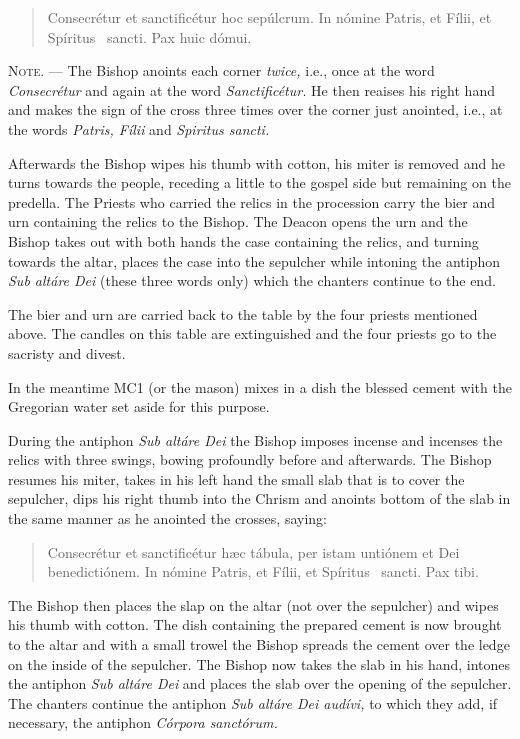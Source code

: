 \documentclass[letterpaper]{report}
\begin{document}
{    \begin{quote}
        Conse\cross crétur et sancti\cross ficétur hoc sepúlcrum. In nómine
        Pa\cross tris, et Fí\cross lii, et Spíritus \cross\ sancti. Pax huic
        dómui.
    \end{quote}

    \textsc{Note. ---} The Bishop anoints each corner \textit{twice,} i.e.,
    once at the word \textit{Consecr\'etur} and again at the word
    \textit{Sanctific\'etur.} He then reaises his right hand and makes the sign
    of the cross three times over the corner just anointed, i.e., at the words
    \textit{Patris, F\'ilii} and \textit{Spiritus sancti.}

    \rubric Afterwards the Bishop wipes his thumb with cotton, his miter is
    removed and he turns towards the people, receding a little to the gospel
    side but remaining on the predella. The Priests who carried the relics in
    the procession carry the bier and urn containing the relics to the Bishop.
    The Deacon opens the urn and the Bishop takes out with both hands the case
    containing the relics, and turning towards the altar, places the case into
    the sepulcher while intoning the antiphon \textit{Sub alt\'are Dei} (these
    three words only) which the chanters continue to the end.

    The bier and urn are carried back to the table by the four priests mentioned
    above. The candles on this table are extinguished and the four priests go to
    the sacristy and divest.

    In the meantime MC1 (or the mason) mixes in a dish the blessed cement with
    the Gregorian water set aside for this purpose.

    \rubric During the antiphon \textit{Sub alt\'are Dei} the Bishop imposes
    incense and incenses the relics with three swings, bowing profoundly before
    and afterwards. The Bishop resumes his miter, takes in his left hand the
    small slab that is to cover the sepulcher, dips his right thumb into the
    Chrism and anoints bottom of the slab in the same manner as he anointed the
    crosses, saying:

    \begin{quote}
        Conse\cross crétur et sancti\cross ficétur h\ae c tábula, per istam
        untiónem et Dei benedictiónem. In nómine Pa\cross tris, et Fí\cross lii, et
        Spíritus \cross\ sancti. Pax tibi.
    \end{quote}

    \rubric The Bishop then places the slap on the altar (not over the
    sepulcher) and wipes his thumb with cotton. The dish containing the
    prepared cement is now brought to the altar and with a small trowel the
    Bishop spreads the cement over the ledge on the inside of the sepulcher.
    The Bishop now takes the slab in his hand, intones the antiphon \textit{Sub
    alt\'are Dei} and places the slab over the opening of the sepulcher. The
    chanters continue the antiphon \textit{Sub alt\'are Dei aud\'ivi,} to which
    they add, if necessary, the antiphon \textit{C\'orpora sanct\'orum.}

}
\end{document}
